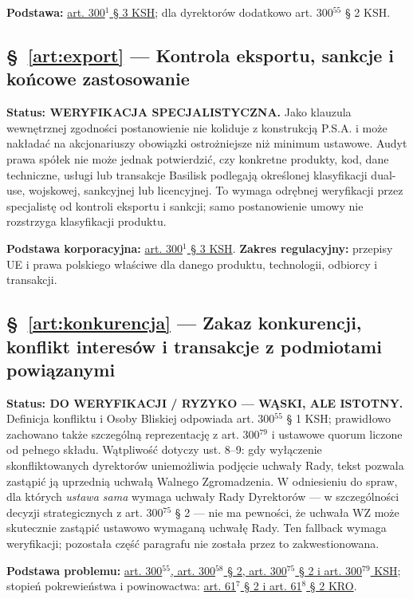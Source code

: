 \documentclass[12pt,a4paper]{report}
\newcounter{paragraf}
\begin{document}
\textbf{Podstawa:} \href{https://eli.gov.pl/api/acts/DU/2024/18/text.html}{art. 300$^{1}$ § 3 KSH}; dla dyrektorów dodatkowo art. 300$^{55}$ § 2 KSH.

\subsection*{§~\ref{art:export} — Kontrola eksportu, sankcje i końcowe zastosowanie}
\textbf{Status: WERYFIKACJA SPECJALISTYCZNA.} Jako klauzula wewnętrznej zgodności postanowienie nie koliduje z konstrukcją P.S.A. i może nakładać na akcjonariuszy obowiązki ostrożniejsze niż minimum ustawowe. Audyt prawa spółek nie może jednak potwierdzić, czy konkretne produkty, kod, dane techniczne, usługi lub transakcje Basilisk podlegają określonej klasyfikacji dual-use, wojskowej, sankcyjnej lub licencyjnej. To wymaga odrębnej weryfikacji przez specjalistę od kontroli eksportu i sankcji; samo postanowienie umowy nie rozstrzyga klasyfikacji produktu.

\textbf{Podstawa korporacyjna:} \href{https://eli.gov.pl/api/acts/DU/2024/18/text.html}{art. 300$^{1}$ § 3 KSH}. \textbf{Zakres regulacyjny:} przepisy UE i prawa polskiego właściwe dla danego produktu, technologii, odbiorcy i transakcji.

\subsection*{§~\ref{art:konkurencja} — Zakaz konkurencji, konflikt interesów i transakcje z podmiotami powiązanymi}
\textbf{Status: DO WERYFIKACJI / RYZYKO — WĄSKI, ALE ISTOTNY.} Definicja konfliktu i Osoby Bliskiej odpowiada art. 300$^{55}$ § 1 KSH; prawidłowo zachowano także szczególną reprezentację z art. 300$^{79}$ i ustawowe quorum liczone od pełnego składu. Wątpliwość dotyczy ust. 8--9: gdy wyłączenie skonfliktowanych dyrektorów uniemożliwia podjęcie uchwały Rady, tekst pozwala zastąpić ją uprzednią uchwałą Walnego Zgromadzenia. W odniesieniu do spraw, dla których \emph{ustawa sama} wymaga uchwały Rady Dyrektorów — w szczególności decyzji strategicznych z art. 300$^{75}$ § 2 — nie ma pewności, że uchwała WZ może skutecznie zastąpić ustawowo wymaganą uchwałę Rady. Ten fallback wymaga weryfikacji; pozostała część paragrafu nie została przez to zakwestionowana.

\textbf{Podstawa problemu:} \href{https://eli.gov.pl/api/acts/DU/2024/18/text.html}{art. 300$^{55}$, art. 300$^{58}$ § 2, art. 300$^{75}$ § 2 i art. 300$^{79}$ KSH}; stopień pokrewieństwa i powinowactwa: \href{https://eli.gov.pl/eli/DU/2026/236/ogl}{art. 61$^{7}$ § 2 i art. 61$^{8}$ § 2 KRO}.
\end{document}
